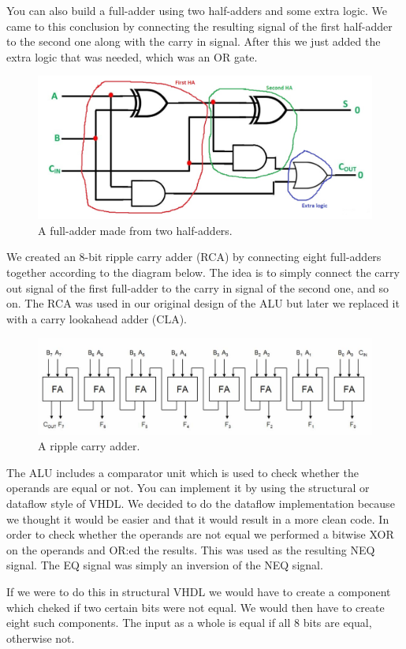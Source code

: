 \documentclass[a4paper,11pt]{article}
\begin{document}
You can also build a full-adder using two half-adders and some extra logic. We came to this conclusion by connecting the resulting signal of the first half-adder to the second one along with the carry in signal. After this we just added the extra logic that was needed, which was an OR gate.

\begin{figure}[h!]
  \centering
  \includegraphics[width=0.5\linewidth]{fulladderfromhalfadder.jpg}
  \caption{A full-adder made from two half-adders.}
  \label{fig:etikett}
\end{figure}

We created an 8-bit ripple carry adder (RCA) by connecting eight full-adders together according to the diagram below. The idea is to simply connect the carry out signal of the first full-adder to the carry in signal of the second one, and so on. The RCA was used in our original design of the ALU but later we replaced it with a carry lookahead adder (CLA).

\begin{figure}[h!]
  \centering
  \includegraphics[width=0.9\linewidth]{rca.jpg}
  \caption{A ripple carry adder.}
  \label{fig:etikett}
\end{figure}

The ALU includes a comparator unit which is used to check whether the operands are equal or not. You can implement it by using the structural or dataflow style of VHDL. We decided to do the dataflow implementation because we thought it would be easier and that it would result in a more clean code. In order to check whether the operands are not equal we performed a bitwise XOR on the operands and OR:ed the results. This was used as the resulting NEQ signal. The EQ signal was simply an inversion of the NEQ signal. 

If we were to do this in structural VHDL we would have to create a component which cheked if two certain bits were not equal. We would then have to create eight such components. The input as a whole is equal if all 8 bits are equal, otherwise not.
\end{document}
